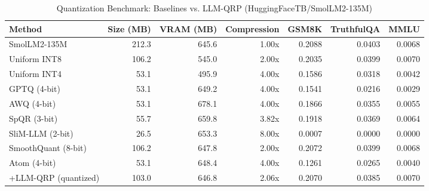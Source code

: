 \begin{table}[htbp]
  \centering
  \small
  \caption{Quantization Benchmark: Baselines vs. LLM-QRP (HuggingFaceTB/SmolLM2-135M)}
  \label{tab:benchmark}
  \begin{tabular}{lrrrrrr}
    \toprule
    \textbf{Method} & \textbf{Size (MB)} & \textbf{VRAM (MB)} & \textbf{Compression} & \textbf{GSM8K} & \textbf{TruthfulQA} & \textbf{MMLU} \\
    \midrule
    SmolLM2-135M & 212.3 & 645.6 & 1.00x & 0.2088 & 0.0403 & 0.0068 \\
    Uniform INT8 & 106.2 & 545.0 & 2.00x & 0.2035 & 0.0399 & 0.0070 \\
    Uniform INT4 & 53.1 & 495.9 & 4.00x & 0.1586 & 0.0318 & 0.0042 \\
    GPTQ (4-bit) & 53.1 & 649.2 & 4.00x & 0.1541 & 0.0216 & 0.0029 \\
    AWQ (4-bit) & 53.1 & 678.1 & 4.00x & 0.1866 & 0.0355 & 0.0055 \\
    SpQR (3-bit) & 55.7 & 659.8 & 3.82x & 0.1918 & 0.0369 & 0.0064 \\
    SliM-LLM (2-bit) & 26.5 & 653.3 & 8.00x & 0.0007 & 0.0000 & 0.0000 \\
    SmoothQuant (8-bit) & 106.2 & 647.8 & 2.00x & 0.2072 & 0.0399 & 0.0068 \\
    Atom (4-bit) & 53.1 & 648.4 & 4.00x & 0.1261 & 0.0265 & 0.0040 \\
    \midrule
    +LLM-QRP (quantized) & 103.0 & 646.8 & 2.06x & 0.2070 & 0.0385 & 0.0070 \\
    \bottomrule
  \end{tabular}
\end{table}
